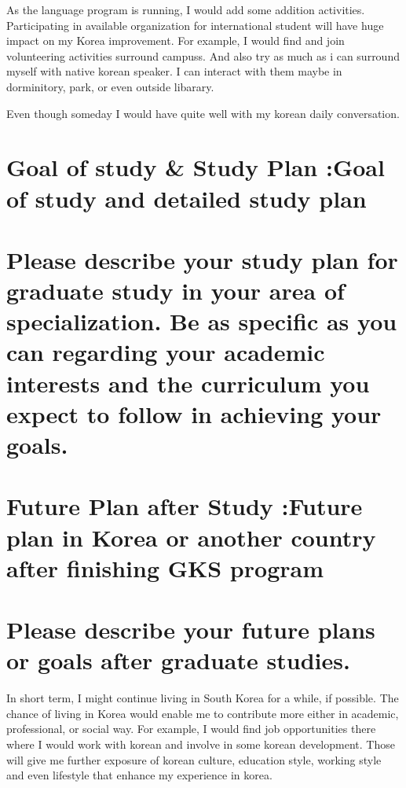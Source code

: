 \documentclass[12pt]{simart} %
\begin{document}
As the language program is running, I would add some addition activities. Participating in available organization for international student will have huge impact on my Korea improvement. For example, I would find and join volunteering activities surround campuss. And also try as much as i can surround myself with native korean speaker. I can interact with them maybe in dorminitory, park, or even outside libarary.

Even though someday I would have quite well with my korean daily conversation.


























\section{Goal of study \& Study Plan :Goal of study and detailed study plan}
\section*{Please describe your study plan for graduate study in your area of specialization. Be as specific as you can regarding your academic interests and the curriculum you expect to follow in achieving your goals.}

\section{Future Plan after Study :Future plan in Korea or another country after finishing GKS program}
\section*{Please describe your future plans or goals after graduate studies.}

In short term, I might continue living in South Korea for a while, if possible.  The chance of living in Korea would enable me to contribute more either in academic, professional, or social way. For example, I would find job opportunities there where I would work with korean and involve in some korean development. Those will give me further exposure of korean culture, education style, working style and even lifestyle that enhance my experience in korea.
\end{document}
